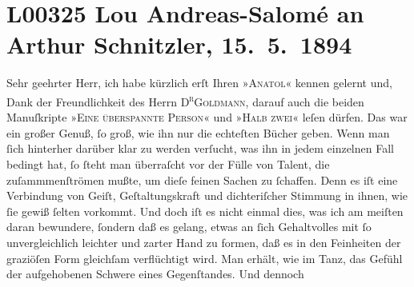 

\section[Lou Andreas-Salomé an Arthur Schnitzler, 15. 5. 1894]{L00325 Lou Andreas-Salomé an Arthur Schnitzler, 15. 5. 1894}
\nopagebreak{}
\rehead{ }\normalsize\beginnumbering{}
\toendnotes[C]{\smallbreak\pagebreak[2]}
\pstart{}{\pb}Sehr geehrter Herr,\pend\vspace{0.5em}
\pstart
           ich habe kürzlich erſt Ihren »\textsc{Anatol}« kennen gelernt und, Dank der Freundlichkeit des Herrn \textsc{D\textsuperscript{r}}\textsc{Goldmann}, darauf auch die beiden Manuſkripte »\textsc{Eine überspannte Person}« und »\textsc{Halb zwei}« leſen dürfen. Das war ein großer Genuß, ſo groß, wie ihn nur die echteſten
               Bücher geben. Wenn man ſich hinterher darüber klar zu werden verſucht, was ihn in
               jedem einzelnen Fall bedingt hat, ſo ſteht man überraſcht vor der Fülle von Talent,
               die zuſammmenſtrömen mußte, um dieſe feinen Sachen zu ſchaffen. Denn es iſt eine
               Verbindung von Geiſt, Geſtaltungskraft und dichteriſcher Stimmung in ihnen, wie ſie
               gewiß ſelten vorkommt. Und doch iſt es nicht einmal dies, was ich am meiſten {\pb}daran bewundere, ſondern daß es gelang,
               etwas an ſich Gehaltvolles mit ſo unvergleichlich leichter und zarter Hand zu formen,
               daß es in den Feinheiten der graziöſen Form gleichſam verflüchtigt wird. Man erhält,
               wie im Tanz, das Gefühl der aufgehobenen Schwere eines Gegenſtandes. Und dennoch
